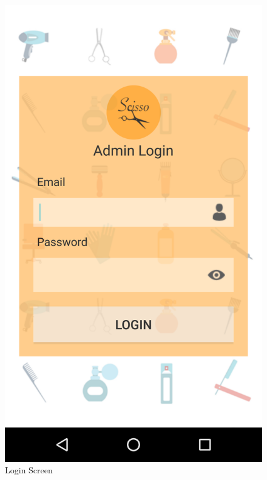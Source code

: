 \begin{figure}[h]
	\centering
	\includegraphics[width=0.7\linewidth]{LoginScreen}
	\caption{Login Screen}
\end{figure}
\pagebreak

